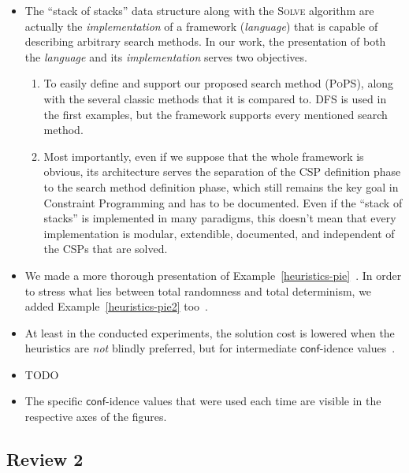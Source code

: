 \documentclass{ws-ijait}
\begin{document}
\begin{itemize}
  \item The ``stack of stacks'' data structure along with
        the \textsc{Solve} algorithm are actually the
        \emph{implementation} of a framework
        (\emph{language}) that is capable of describing
        arbitrary search methods. In our work, the
        presentation of both the \emph{language} and its
        \emph{implementation} serves two objectives.
        \begin{enumerate}
          \item To easily define and support our proposed
                search method (\textsc{PoPS}), along with
                the several classic methods that it is
                compared to. DFS is used in the first
                examples, but the framework supports every
                mentioned search method.
          \item Most importantly, even if we suppose that
                the whole framework is obvious, its
                architecture serves the separation of the
                CSP definition phase to the search method
                definition phase, which still remains the
                key goal in Constraint
                Programming\cite{Freuder2014} and has to be
                documented. Even if the ``stack of stacks''
                is implemented in many paradigms, this
                doesn't mean that every implementation is
                modular, extendible, documented, and
                independent of the CSPs that are solved.
          \end{enumerate}
  \item We made a more thorough presentation of
        Example~\ref{heuristics-pie}~. In order
        to stress what lies between total randomness and
        total determinism, we added
        Example~\ref{heuristics-pie2} too~.
  \item At least in the conducted experiments, the solution
        cost is lowered when the heuristics are \emph{not}
        blindly preferred, but for intermediate
        $\mathsf{conf}$-idence values~.
  \item TODO
  \item The specific $\mathsf{conf}$-idence values that were
        used each time are visible in the respective axes
        of the figures.
\end{itemize}

\subsection*{Review 2}
\end{document}
